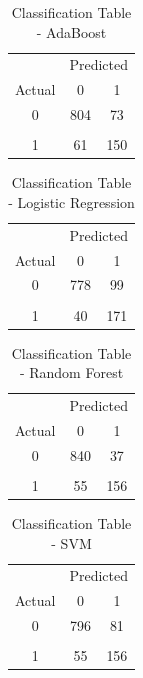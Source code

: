 \documentclass[12pt, letterpaper]{article}
\begin{document}
\begin{center} 
\begin{table}[H]
\caption{Classification Table - AdaBoost}
\label{tab:6domcri}
\centering
\begin{tabular}{c c c} 
\hline\hline           
 & \multicolumn{2}{c}{Predicted} \\
 Actual & 0 & 1 \\
 \hline
 0  & 804 & 73 \\
 \\
 1  & 61 & 150 \\
\hline
\end{tabular} 
\end{table}
\end{center}

\begin{center} 
\begin{table}[H]
\caption{Classification Table - Logistic Regression}
\label{tab:6domcri}
\centering
\begin{tabular}{c c c} 
\hline\hline           
 & \multicolumn{2}{c}{Predicted} \\
 Actual & 0 & 1 \\
 \hline
 0  & 778 & 99 \\
 \\
 1  & 40 & 171 \\
\hline
\end{tabular} 
\end{table}
\end{center}

\begin{center} 
\begin{table}[H]
\caption{Classification Table - Random Forest}
\label{tab:6domcri}
\centering
\begin{tabular}{c c c} 
\hline\hline           
 & \multicolumn{2}{c}{Predicted} \\
 Actual & 0 & 1 \\
 \hline
 0  & 840 & 37 \\
 \\
 1  & 55 & 156 \\
\hline
\end{tabular} 
\end{table}
\end{center}

\begin{center} 
\begin{table}[H]
\caption{Classification Table - SVM}
\label{tab:6domcri}
\centering
\begin{tabular}{c c c} 
\hline\hline           
 & \multicolumn{2}{c}{Predicted} \\
 Actual & 0 & 1 \\
 \hline
 0  & 796 & 81 \\
 \\
 1  & 55 & 156 \\
\hline
\end{tabular} 
\end{table}
\end{center}
\end{document}
